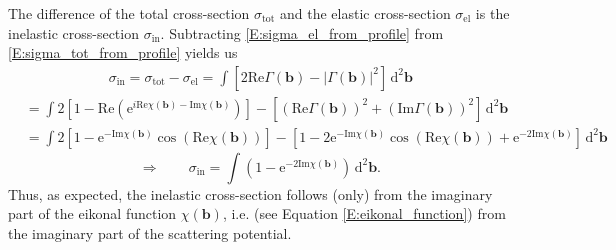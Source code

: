 \documentclass[a4paper, twoside, english, 12pt]{report}
\begin{document}
The difference of the total cross-section $\sigma_\text{tot}$ and the elastic cross-section $\sigma_\text{el}$ is the inelastic cross-section $\sigma_\text{in}$. Subtracting \eqref{E:sigma_el_from_profile} from \eqref{E:sigma_tot_from_profile} yields us
\begin{align*}
	&\qquad\qquad\qquad\sigma_\text{in} = \sigma_\text{tot} - \sigma_\text{el} = \int \left[ 2\text{Re}\Gamma(\mathbf{b}) - \left|\Gamma(\mathbf{b})\right|^2 \right] \,\text{d}^2\mathbf{b} \\
	&= \int 2\left[1-\text{Re}\left( \text{e}^{i\text{Re}\chi(\mathbf{b})-\text{Im}\chi(\mathbf{b})}\right)\right] - \left[\left(\text{Re}\Gamma(\mathbf{b})\right)^2+\left(\text{Im}\Gamma(\mathbf{b})\right)^2\right] \,\text{d}^2\mathbf{b} \\
	&= \int 2\left[1- \text{e}^{-\text{Im}\chi(\mathbf{b})}\cos(\text{Re}\chi(\mathbf{b}))\right] - \left[1- 2\text{e}^{-\text{Im}\chi(\mathbf{b})}\cos(\text{Re}\chi(\mathbf{b})) +\text{e}^{-2\text{Im}\chi(\mathbf{b})}\right] \,\text{d}^2\mathbf{b}
\end{align*}
\begin{equation}\label{E:sigma_in_from_profile}
\Rightarrow \qquad	\sigma_\text{in}= \int \left(1 -\text{e}^{-2\text{Im}\chi(\mathbf{b})}\right) \,\text{d}^2\mathbf{b}.
\end{equation}
Thus, as expected, the inelastic cross-section follows (only) from the imaginary part of the eikonal function $\chi(\mathbf{b})$, i.e. (see Equation \eqref{E:eikonal_function}) from the imaginary part of the scattering potential.
\end{document}
